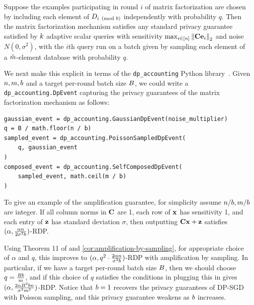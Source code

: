 \documentclass{article}
\begin{document}
\begin{cor}\label{cor:amplification-by-sampling}
Suppose the examples participating in round $i$ of matrix factorization are chosen by including each element of $D_{i \pmod {b}}$ independently with probability $q$. Then the matrix factorization mechanism satisfies any standard privacy guarantee satisfied by  $k$ adaptive scalar queries with sensitivity $\max_{i \in [n]} \left\|\mathbf{C} \mathbf{e}_i\right\|_2$ and noise $N(0, \sigma^2)$, with the $i$th query run on a batch given by sampling each element of a $\check{m}$-element database with probability $q$. 
\end{cor}

We next make this explicit in terms of the \texttt{dp\_accounting} Python library~\citep{pldlib}. Given $n, m, b$ and a target per-round batch size $B$, we could write a \texttt{dp\_accounting.DpEvent} capturing the privacy guarantees of the matrix factorization mechanism as follows:

\begin{verbatim}
gaussian_event = dp_accounting.GaussianDpEvent(noise_multiplier)
q = B / math.floor(n / b)
sampled_event = dp_accounting.PoissonSampledDpEvent(
    q, gaussian_event
)
composed_event = dp_accounting.SelfComposedDpEvent(
    sampled_event, math.ceil(m / b)
)
\end{verbatim}




\begin{example}
To give an example of the amplification guarantee, for simplicity assume $n / b, m / b$ are integer. If all column norms in $\mathbf{C}$ are 1, each row of $\mathbf{x}$ has sensitivity 1, and each entry of $\mathbf{z}$ has standard deviation $\sigma$, then outputting $\mathbf{C} \mathbf{x} + \mathbf{z}$ satisfies $(\alpha, \frac{\alpha n}{2 \sigma^2 b})$-RDP. 

Using Theorem 11 of \cite{MTZ19} and \cref{cor:amplification-by-sampling}, for appropriate choice of $\alpha$ and $q$, this improves to $(\alpha, q^2 \cdot \frac{2 \alpha n}{\sigma^2 b})$-RDP with amplification by sampling. In particular, if we have a target per-round batch size $B$, then we should choose $q = \frac{B b}{m}$, and if this choice of $q$ satisfies the conditions in \cite{MTZ19} plugging this in gives $(\alpha, \frac{2 \alpha B^2 b n}{\sigma^2 m^2})$-RDP. Notice that $b = 1$ recovers the privacy guarantees of DP-SGD with Poisson sampling, and this privacy guarantee weakens as $b$ increases.
\end{example}
\end{document}
